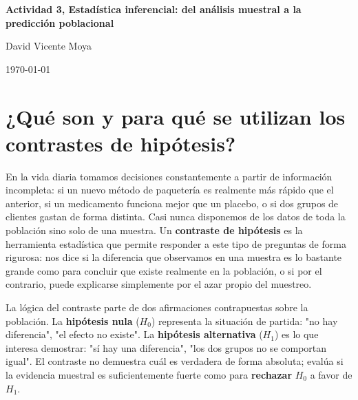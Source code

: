 \documentclass[11pt, a4paper]{article}
\begin{document}
\begin{titlepage}
\centering

\vspace*{\fill}

{\Huge \textbf{Actividad 3, Estadística inferencial: del análisis muestral a 
la predicción poblacional}\par}

\vspace{1.5cm}

{\Large David Vicente Moya\par}

\vspace{0.5cm}

{\large \today\par}

\vspace*{\fill}

\end{titlepage}

\newpage
\tableofcontents
\thispagestyle{empty}
\setcounter{page}{0}

\newpage

\section{¿Qué son y para qué se utilizan los contrastes de hipótesis?}

En la vida diaria tomamos decisiones constantemente a partir de información incompleta: si 
un nuevo método de paquetería es realmente más rápido que el anterior, si un medicamento 
funciona mejor que un placebo, o si dos grupos de clientes gastan de forma distinta. Casi 
nunca disponemos de los datos de toda la población sino solo de una muestra. Un 
\textbf{contraste de hipótesis} es la herramienta estadística que permite responder a este 
tipo de preguntas de forma rigurosa: nos dice si la diferencia que observamos en una 
muestra es lo bastante grande como para concluir que existe realmente en la población, o si 
por el contrario, puede explicarse simplemente por el azar propio del muestreo.

La lógica del contraste parte de dos afirmaciones contrapuestas sobre la población. La 
\textbf{hipótesis nula} ($H_0$) representa la situación de partida: "no hay diferencia", 
"el efecto no existe". La \textbf{hipótesis alternativa} ($H_1$) es lo que interesa demostrar: 
"sí hay una diferencia", "los dos grupos no se comportan igual". El contraste no demuestra 
cuál es verdadera de forma absoluta; evalúa si la evidencia muestral es suficientemente 
fuerte como para \textbf{rechazar} $H_0$ a favor de $H_1$.
\end{document}
